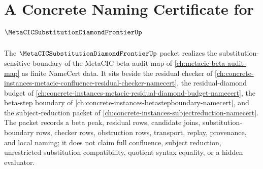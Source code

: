 \chapter{A Concrete Naming Certificate for $\MetaCICSubstitutionDiamondFrontierUp$}
\label{ch:concrete-instances-metacic-substitution-diamond-frontier-namecert}

The $\MetaCICSubstitutionDiamondFrontierUp$ packet realizes the substitution-sensitive boundary of the MetaCIC beta audit map of \autoref{ch:metacic-beta-audit-map} as finite NameCert data. It sits beside the residual checker of \autoref{ch:concrete-instances-metacic-confluence-residual-checker-namecert}, the residual-diamond budget of \autoref{ch:concrete-instances-metacic-residual-diamond-budget-namecert}, the beta-step boundary of \autoref{ch:concrete-instances-betastepboundary-namecert}, and the subject-reduction packet of \autoref{ch:concrete-instances-subjectreduction-namecert}. The packet records a beta peak, residual rows, candidate joins, substitution-boundary rows, checker rows, obstruction rows, transport, replay, provenance, and local naming; it does not claim full confluence, subject reduction, unrestricted substitution compatibility, quotient syntax equality, or a hidden evaluator.

